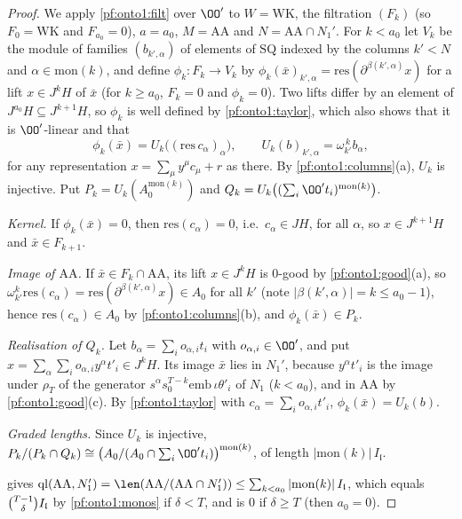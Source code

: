 \begin{proof}
We apply \cref{pf:onto1:filt} over $\OO'$ to $W=\mathrm{WK}$, the filtration $(F_k)$ (so $F_0=\mathrm{WK}$ and $F_{a_0}=0$), $a=a_0$,
$M=\mathrm{AA}$ and $N=\mathrm{AA}\cap N_1'$. For $k<a_0$ let $V_k$ be the module of families $(b_{k',\alpha})$ of elements of
$\mathrm{SQ}$ indexed by the columns $k'<N$ and $\alpha\in\mathrm{mon}(k)$, and define $\phi_k\colon F_k\to V_k$ by
$\phi_k(\bar x)_{k',\alpha}=\mathrm{res}(\partial^{\beta(k',\alpha)}x)$ for a lift $x\in J^kH$ of $\bar x$ (for $k\ge a_0$, $F_k=0$ and
$\phi_k=0$). Two lifts differ by an element of $J^{a_0}H\subseteq J^{k+1}H$, so $\phi_k$ is well defined by
\cref{pf:onto1:taylor}, which also shows that it is $\OO'$-linear and that
\[
\phi_k(\bar x)=U_k\bigl((\mathrm{res}\,c_\alpha)_\alpha\bigr),\qquad U_k(b)_{k',\alpha}=\omega_{k'}^{\,k}b_\alpha ,
\]
for any representation $x=\sum_\mu y^\mu c_\mu+r$ as there. By \cref{pf:onto1:columns}(a), $U_k$ is injective. Put
$P_k=U_k(A_0^{\mathrm{mon}(k)})$ and $Q_k=U_k\bigl((\sum_i\OO't_i)^{\mathrm{mon}(k)}\bigr)$.

\emph{Kernel.} If $\phi_k(\bar x)=0$, then $\mathrm{res}(c_\alpha)=0$, i.e.\ $c_\alpha\in JH$, for all $\alpha$, so $x\in J^{k+1}H$ and
$\bar x\in F_{k+1}$.

\emph{Image of $\mathrm{AA}$.} If $\bar x\in F_k\cap\mathrm{AA}$, its lift $x\in J^kH$ is $0$-good by \cref{pf:onto1:good}(a), so
$\omega_{k'}^k\mathrm{res}(c_\alpha)=\mathrm{res}(\partial^{\beta(k',\alpha)}x)\in A_0$ for all $k'$ (note $|\beta(k',\alpha)|=k\le a_0-1$),
hence $\mathrm{res}(c_\alpha)\in A_0$ by \cref{pf:onto1:columns}(b), and $\phi_k(\bar x)\in P_k$.

\emph{Realisation of $Q_k$.} Let $b_\alpha=\sum_io_{\alpha,i}t_i$ with $o_{\alpha,i}\in\OO'$, and put $x=\sum_\alpha\sum_io_{\alpha,i}
y^\alpha t'_i\in J^kH$. Its image $\bar x$ lies in $N_1'$, because $y^\alpha t'_i$ is the image under $\rho_T$ of the generator
$s^\alpha s_0^{T-k}\mathrm{emb}\,\iota\theta'_i$ of $N_1$ ($k<a_0$), and in $\mathrm{AA}$ by \cref{pf:onto1:good}(c). By
\cref{pf:onto1:taylor} with $c_\alpha=\sum_io_{\alpha,i}t'_i$, $\phi_k(\bar x)=U_k(b)$.

\emph{Graded lengths.} Since $U_k$ is injective, $P_k/(P_k\cap Q_k)\cong\bigl(A_0/(A_0\cap\sum_i\OO't_i)\bigr)^{\mathrm{mon}(k)}$, of
length $|\mathrm{mon}(k)|\,I_{\mathfrak l}$.

 gives $\ontooneql(\mathrm{AA},N_1')=\len(\mathrm{AA}/(\mathrm{AA}\cap N_1'))\le\sum_{k<a_0}|\mathrm{mon}(k)|\,I_{\mathfrak
l}$, which equals $\binom{T-1}{\delta} I_{\mathfrak l}$ by \cref{pf:onto1:monos} if $\delta<T$, and is $0$ if $\delta\ge T$ (then
$a_0=0$).
\end{proof}

